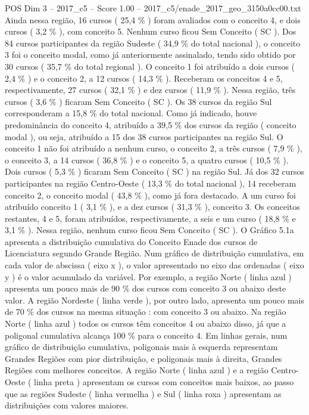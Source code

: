 \begin{textsample}{POS Dim 3 – 2017\_c5 – Score 1.00 – 2017\_c5/enade\_2017\_geo\_3150a0cc00.txt}
Ainda nessa região, 16 cursos ( 25,4 \% ) foram avaliados com o conceito 4, e dois cursos ( 3,2 \% ), com conceito 5.
Nenhum curso ficou Sem Conceito ( SC ).
Dos 84 cursos participantes da região Sudeste ( 34,9 \% do total nacional ), o conceito 3 foi o conceito modal, como já anteriormente assinalado, tendo sido obtido por 30 cursos ( 35,7 \% do total regional ).
O conceito 1 foi atribuído a dois cursos ( 2,4 \% ) e o conceito 2, a 12 cursos ( 14,3 \% ).
Receberam os conceitos 4 e 5, respectivamente, 27 cursos ( 32,1 \% ) e dez cursos ( 11,9 \% ).
Nessa região, três cursos ( 3,6 \% ) ficaram Sem Conceito ( SC ).
Os 38 cursos da região Sul corresponderam a 15,8 \% do total nacional.
Como já indicado, houve predominância do conceito 4, atribuído a 39,5 \% dos cursos da região ( conceito modal ), ou seja, atribuído a 15 dos 38 cursos participantes na região Sul.
O conceito 1 não foi atribuído a nenhum curso, o conceito 2, a três cursos ( 7,9 \% ), o conceito 3, a 14 cursos ( 36,8 \% ) e o conceito 5, a quatro cursos ( 10,5 \% ).
Dois cursos ( 5,3 \% ) ficaram Sem Conceito ( SC ) na região Sul.
Já dos 32 cursos participantes na região Centro-Oeste ( 13,3 \% do total nacional ), 14 receberam conceito 2, o conceito modal ( 43,8 \% ), como já fora destacado.
A um curso foi atribuído conceito 1 ( 3,1 \% ), e a dez cursos ( 31,3 \% ), conceito 3.
Os conceitos restantes, 4 e 5, foram atribuídos, respectivamente, a seis e um curso ( 18,8 \% e 3,1 \% ).
Nessa região, nenhum curso ficou Sem Conceito ( SC ).
O Gráfico 5.1a apresenta a distribuição cumulativa do Conceito Enade dos cursos de Licenciatura segundo Grande Região.
Num gráfico de distribuição cumulativa, em cada valor de abscissa ( eixo x ), o valor apresentado no eixo das ordenadas ( eixo y ) é o valor acumulado da variável.
Por exemplo, a região Norte ( linha azul ) apresenta um pouco mais de 90 \% dos cursos com conceito 3 ou abaixo deste valor.
A região Nordeste ( linha verde ), por outro lado, apresenta um pouco mais de 70 \% dos cursos na mesma situação : com conceito 3 ou abaixo.
Na região Norte ( linha azul ) todos os cursos têm conceitos 4 ou abaixo disso, já que a poligonal cumulativa alcança 100 \% para o conceito 4.
Em linhas gerais, num gráfico de distribuição cumulativa, poligonais mais à esquerda representam Grandes Regiões com pior distribuição, e poligonais mais à direita, Grandes Regiões com melhores conceitos.
A região Norte ( linha azul ) e a região Centro-Oeste ( linha preta ) apresentam os cursos com conceitos mais baixos, ao passo que as regiões Sudeste ( linha vermelha ) e Sul ( linha roxa ) apresentam as distribuições com valores maiores.

\end{textsample}
